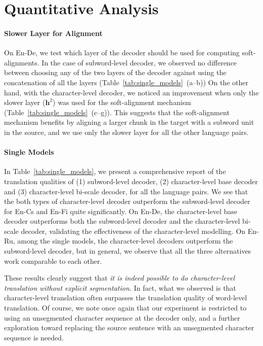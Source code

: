 \documentclass[11pt]{article}
\newcommand{\vect}[1]{\mathbf{#1}}
\newcommand{\vh}[0]{\vect{h}}
\begin{document}
\section{Quantitative Analysis}

\paragraph{Slower Layer for Alignment}
On En-De, we test which layer of the decoder should be used for computing
soft-alignments. In the case of subword-level decoder, we observed no
difference between choosing any of the two layers of the decoder against using
the concatenation of all the layers (Table~\ref{tab:single_models}~(a--b)) On
the other hand, with the character-level decoder, we noticed an improvement when
only the slower layer ($\vh^2$) was used for the soft-alignment mechanism
(Table~\ref{tab:single_models}~(c--g)).  This suggests that the soft-alignment
mechanism benefits by aligning a larger chunk in the target with a subword unit
in the source, and we use only the slower layer for all the other language
pairs.

\paragraph{Single Models}
In Table~\ref{tab:single_models}, we present a comprehensive report of the
translation qualities of (1) subword-level decoder, (2) character-level base
decoder and (3) character-level bi-scale decoder, for all the language pairs. We
see that the both types of character-level decoder outperform the subword-level
decoder for En-Cs and En-Fi quite significantly. On En-De, the
character-level base decoder outperforms both the subword-level
decoder and the character-level bi-scale decoder, validating the
effectiveness of the character-level modelling.
On En-Ru, among the single models, the character-level decoders
outperform the subword-level decoder, but in general, we observe that all the three
alternatives work comparable to each other. 

These results clearly suggest that
{\em it is indeed possible to do character-level translation without
explicit segmentation.} In fact, what we observed is that character-level
translation often surpasses the translation quality of
word-level translation. Of course, we note once again that our experiment is
restricted to using an unsegmented character sequence at the decoder only, and a
further exploration toward replacing the source sentence with an unsegmented
character sequence is needed.
\end{document}
